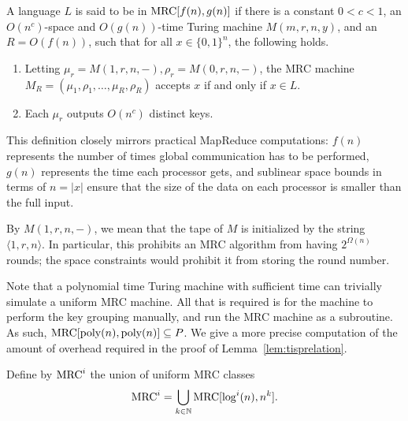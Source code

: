 \begin{definition}

A language $L$ is said to be in $\textup{MRC}[f(n),g(n)]$ if there is a constant $0 < c
< 1$, an $O(n^c)$-space and $O(g(n))$-time Turing machine $M(m, r, n, y)$, and
an $R = O(f(n))$, such that for all $x \in \{ 0,1 \}^n$, the following holds.

\begin{enumerate}
\item Letting $\mu_r = M(1, r, n, -), \rho_r = M(0, r, n, -)$, the MRC machine
$M_R = (\mu_1, \rho_1, \dots, \mu_R, \rho_R)$ accepts $x$ if and only if $x \in
L$.

\item Each $\mu_r$ outputs $O(n^c)$ distinct keys.
\end{enumerate}

\end{definition}

This definition closely mirrors practical MapReduce computations:  $f(n)$
represents the number of times global communication has to be performed, $g(n)$
represents the  time each processor gets, and sublinear space bounds in terms
of $n = |x|$ ensure that the size of the data on each processor is smaller than
the full input.

\begin{remark}
By $M(1, r, n, -)$, we mean that the tape of $M$ is initialized by the string
$\langle 1, r, n \rangle$. In particular, this prohibits an MRC algorithm from
having $2^{\Omega(n)}$ rounds; the space constraints would prohibit it from
storing the round number.
\end{remark}

\begin{remark}\label{remark:timebound}
Note that a polynomial time Turing machine with sufficient time can trivially
simulate a uniform MRC machine. All that is required is for the machine to
perform the key grouping manually, and run the MRC machine as a subroutine. As
such, $\textup{MRC}[\text{poly}(n), \text{poly}(n)] \subseteq P$. We give a more precise
computation of the amount of overhead required in the proof of
Lemma~\ref{lem:tisprelation}.
\end{remark}

\begin{definition}
Define by $\textup{MRC}^i$ the union of uniform MRC classes
\[
   \textup{MRC}^i = \bigcup_{k\in\mathbb{N}}\textup{MRC}[\log^i(n),n^k].
\]
\end{definition}

